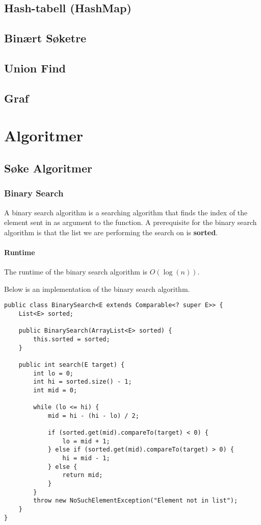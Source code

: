 \documentclass{article}
\begin{document}
    \subsection{Hash-tabell (HashMap)}
    \subsection{Binært Søketre}
    \subsection{Union Find}
    \subsection{Graf}
    \section{Algoritmer}
    \subsection{Søke Algoritmer}
    \subsubsection{Binary Search}
    A binary search algorithm is a searching algorithm that finds the index of the element sent in as argument to the function. A prerequisite for the binary search algorithm is that the list we are performing the search on is \textbf{sorted}.

    \paragraph{Runtime} The runtime of the binary search algorithm is \( O\left( \log\left( n \right) \right) \).
    \medskip

    Below is an implementation of the binary search algorithm.
    \begin{lstlisting}
public class BinarySearch<E extends Comparable<? super E>> {
    List<E> sorted;

    public BinarySearch(ArrayList<E> sorted) {
        this.sorted = sorted;
    }

    public int search(E target) {
        int lo = 0;
        int hi = sorted.size() - 1;
        int mid = 0;

        while (lo <= hi) {
            mid = hi - (hi - lo) / 2;

            if (sorted.get(mid).compareTo(target) < 0) {
                lo = mid + 1;
            } else if (sorted.get(mid).compareTo(target) > 0) {
                hi = mid - 1;
            } else {
                return mid;
            }
        }
        throw new NoSuchElementException("Element not in list");
    }
}
    \end{lstlisting}
\end{document}
